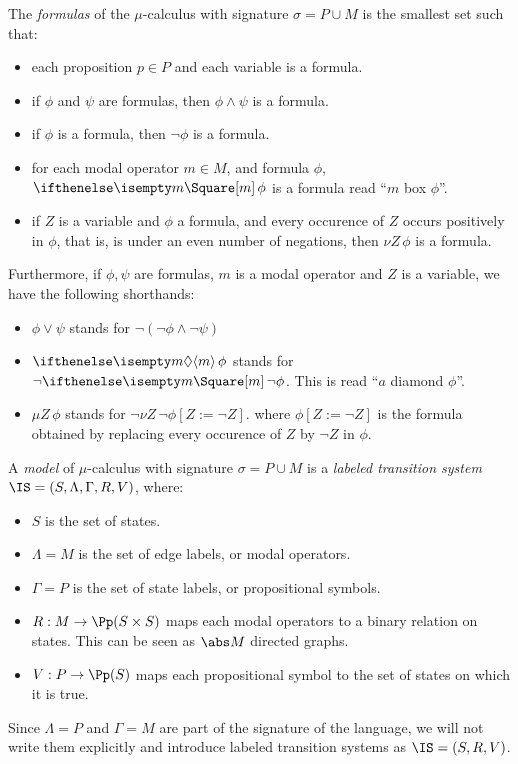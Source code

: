 \begin{definition}
    The \emph{formulas} of the $\mu$-calculus with signature $\sigma = P \cup M$
    is the smallest set such that:
    \begin{itemize}
        \item each proposition $p \in P$ and each variable is a formula.
        \item if $\phi$ and $\psi$ are formulas, then $\phi \wedge \psi$ is a formula.
        \item if $\phi$ is a formula, then $\neg \phi$ is a formula.
        \item for each modal operator $m \in M$, and formula $\phi$,
            $\boite{m} \phi$ is a formula read ``$m$ box $\phi$''.
        \item if $Z$ is a variable and $\phi$ a formula,
            and every occurence of $Z$ occurs positively in $\phi$,
            that is, is under an even number of negations,
            then $\nu Z\, \phi$ is a formula.
    \end{itemize}
    Furthermore, if $\phi, \psi$ are formulas, $m$ is a modal operator
    and $Z$ is a variable, we have the following shorthands:
    \begin{itemize}
        \item $\phi \vee \psi$ stands for $\neg (\neg \phi \wedge \neg \psi)$
        \item $\diam m \phi$ stands for $\neg \boite m \neg\phi$. This is read ``$a$ diamond $\phi$''.
        \item $\mu Z\, \phi$ stands for $\neg \nu Z\, \neg\phi[Z := \neg Z]$.
            where $\phi[Z := \neg Z]$ is the formula obtained by replacing
            every occurence of $Z$ by $\neg Z$ in $\phi$.
    \end{itemize}
\end{definition}


\begin{definition}
    A \emph{model} of $\mu$-calculus with signature $\sigma = P \cup M$
    is a \emph{labeled transition system}
    $\IS = (S, \Lambda, \Gamma, R, V)$, where:
    \begin{itemize}
        \item $S$ is the set of states.
        \item $\Lambda = M$ is the set of edge labels, or modal operators.
        \item $\Gamma = P$ is the set of state labels, or propositional symbols.
        \item $R: M \to \Pp(S \times S)$ maps each
            modal operators to a binary relation on states.
            This can be seen as $\abs M$ directed graphs.
        \item $V: P \to \Pp(S)$ maps each propositional symbol to
            the set of states on which it is true.
    \end{itemize}
    Since $\Lambda = P$ and $\Gamma = M$ are part of the signature of the
    language, we will not write them explicitly and introduce
    labeled transition systems as $\IS = (S, R, V)$.
\end{definition}

